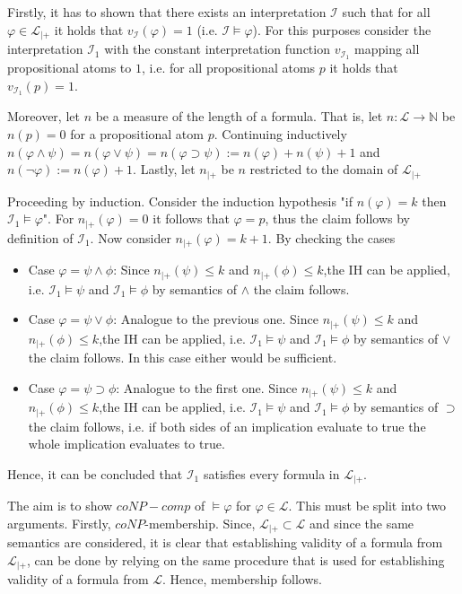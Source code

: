 \documentclass[11pt,a4paper]{article}
\begin{document}
Firstly, it has to shown that there exists an interpretation $\mathcal{I}$ such that for all $\varphi \in \mathcal{L}_{|+}$ it holds that $v_{\mathcal{I}}(\varphi)=1$ (i.e. $\mathcal{I} \models \varphi$). For this purposes consider the interpretation $\mathcal{I}_1$ with the constant interpretation function $v_{\mathcal{I}_1}$ mapping all propositional atoms to $1$, i.e. for all propositional atoms $p$ it holds that $v_{\mathcal{I}_1}(p)=1$. 


Moreover, let $n$ be a measure of the length of a formula. That is, let $n: \mathcal{L} \to \mathbb{N}$ be $n(p)=0$ for a propositional atom $p$. 
Continuing inductively $n(\varphi \land \psi)=n(\varphi \lor \psi)= n(\varphi \supset \psi):= n(\varphi) + n(\psi) + 1$ and $n(\neg \varphi):= n(\varphi)+1$. Lastly, let $n_{|+}$ be $n$ restricted to the domain of $\mathcal{L}_{|+}$


Proceeding by induction. Consider the induction hypothesis "if $n(\varphi)=k$ then $\mathcal{I}_1 \models \varphi$". For $n_{|+}(\varphi)=0$ it follows that $\varphi=p$, thus the claim follows by definition of $\mathcal{I}_1$. Now consider $n_{|+}(\varphi)=k+1$. By checking the cases
\begin{itemize}
\item Case $\varphi= \psi \land \phi$: Since $n_{|+}(\psi)\leq k$ and $n_{|+}(\phi)\leq k$,the IH can be applied, i.e. $\mathcal{I}_1 \models \psi$ and $\mathcal{I}_1 \models \phi$ by semantics of $\land$ the claim follows.
\item Case $\varphi= \psi \lor \phi$: Analogue to the previous one. Since $n_{|+}(\psi)\leq k$ and $n_{|+}(\phi)\leq k$,the IH can be applied, i.e. $\mathcal{I}_1 \models \psi$ and $\mathcal{I}_1 \models \phi$ by semantics of $\lor$ the claim follows. In this case either would be sufficient.
\item Case $\varphi= \psi \supset \phi$: Analogue to the first one. Since $n_{|+}(\psi)\leq k$ and $n_{|+}(\phi)\leq k$,the IH can be applied, i.e. $\mathcal{I}_1 \models \psi$ and $\mathcal{I}_1 \models \phi$ by semantics of $\supset$ the claim follows, i.e. if both sides of an implication evaluate to true the whole implication evaluates to true.
\end{itemize}
Hence, it can be concluded that $\mathcal{I}_1$ satisfies every formula in $\mathcal{L}_{|+}$.


The aim is to show $coNP-comp$ of $\models \varphi$ for $\varphi \in \mathcal{L}$. This must be split into two arguments. 
Firstly, $coNP$-membership. Since, $\mathcal{L}_{|+} \subset \mathcal{L}$ and since the same semantics are considered, it is clear that establishing validity of a formula from $\mathcal{L}_{|+}$, can be done by relying on the same procedure that is used for establishing validity of a formula from $\mathcal{L}$.
Hence, membership follows.
\end{document}

